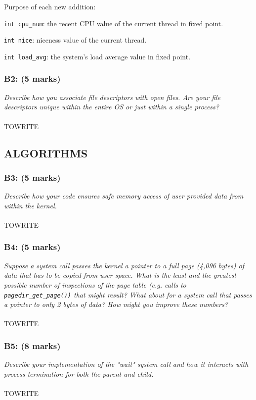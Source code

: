 \documentclass[a4paper,12pt]{article}
\begin{document}
Purpose of each new addition:

\texttt{int cpu\_num}: the recent CPU value of the current thread in fixed point.

\texttt{int nice}: niceness value of the current thread.

\texttt{int load\_avg}: the system's load average value in fixed point.

\subsubsection*{B2: (5 marks) }
\textit{Describe how you associate file descriptors with open files. Are your
file descriptors unique within the entire OS or just within a single process? }
\\ \\ TOWRITE

\subsection{ALGORITHMS}

\subsubsection*{B3: (5 marks) }
\textit{Describe how your code ensures safe memory access of user provided data
from within the kernel. }
\\ \\TOWRITE

\subsubsection*{B4: (5 marks) }
\textit{Suppose a system call passes the kernel a pointer to a full page (4,096
bytes) of data that has to be copied from user space. What is the least and the
greatest possible number of inspections of the page table (e.g. calls to
\texttt{pagedir\_get\_page())} that might result? What about for a system
 call that passes a pointer to only 2 bytes of data? How might you improve these
numbers? }
\\ \\TOWRITE

\subsubsection*{B5: (8 marks) }
\textit{Describe your implementation of the "wait" system call and how it interacts
with process termination for both the parent and child.}
\\ \\ TOWRITE
\end{document}
